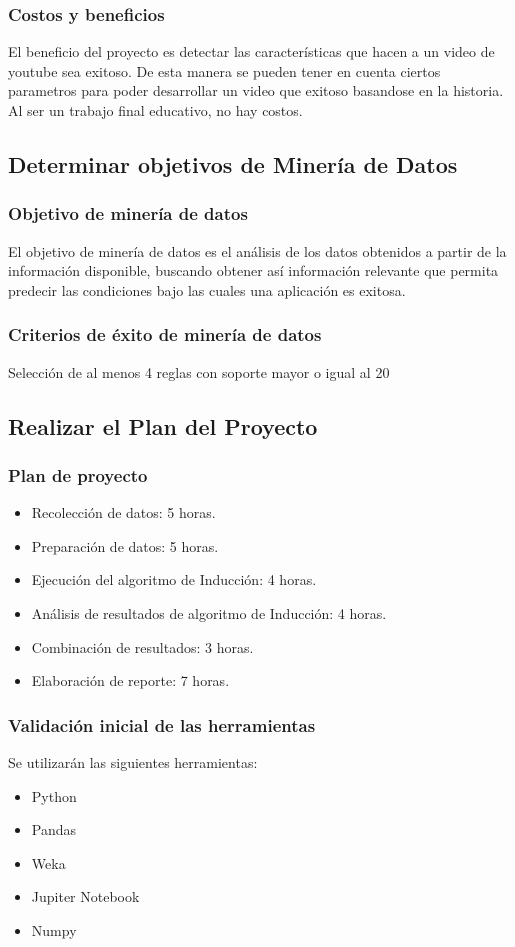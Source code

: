     \subsubsection{Costos y beneficios}
        El beneficio del proyecto es detectar las características que hacen a
        un video de youtube sea exitoso. De esta manera se pueden tener en
        cuenta ciertos parametros para poder desarrollar un video que exitoso
        basandose en la historia.
        Al ser un trabajo final educativo, no hay costos.
\subsection{Determinar objetivos de Minería de Datos}
    \subsubsection{Objetivo de minería de datos}
    El objetivo de minería de datos es el análisis de los datos obtenidos a
    partir de la información disponible, buscando obtener así información
    relevante que permita predecir las condiciones bajo las cuales una
    aplicación es exitosa.
    \subsubsection{Criterios de éxito de minería de datos}
    Selección de al menos 4 reglas con soporte mayor o igual al 20%
\subsection{Realizar el Plan del Proyecto}
    \subsubsection{Plan de proyecto}
        \begin{itemize}
            \item Recolección de datos: 5 horas.
            \item Preparación de datos: 5 horas.
            \item Ejecución del algoritmo de Inducción: 4 horas.
            \item Análisis de resultados de algoritmo de Inducción: 4 horas.
            \item Combinación de resultados: 3 horas.
            \item Elaboración de reporte: 7 horas.
        \end{itemize}
    \subsubsection{Validación inicial de las herramientas}
        Se utilizarán las siguientes herramientas:
        \begin{itemize}
            \item Python
            \item Pandas
            \item Weka
            \item Jupiter Notebook
            \item Numpy
        \end{itemize}
